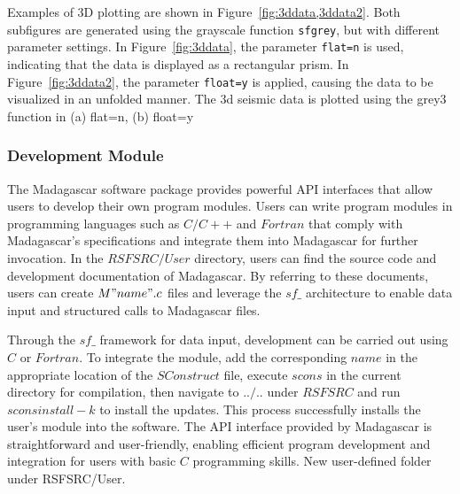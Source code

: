 Examples of 3D plotting are shown in Figure~\ref{fig:3ddata,3ddata2}. Both subfigures are generated using the grayscale function \texttt{sfgrey}, but with different parameter settings. In Figure~\ref{fig:3ddata}, the parameter \texttt{flat=n} is used, indicating that the data is displayed as a rectangular prism. In Figure~\ref{fig:3ddata2}, the parameter \texttt{float=y} is applied, causing the data to be visualized in an unfolded manner.
{The 3d seismic data is plotted using the grey3 function in (a) flat=n, (b) float=y}

\subsubsection{Development Module}

The Madagascar software package provides powerful API interfaces that allow users to develop their own program modules. Users can write program modules in programming languages such as $C/C++$ and $Fortran$ that comply with Madagascar's specifications and integrate them into Madagascar for further invocation. In the $RSFSRC/User$ directory, users can find the source code and development documentation of Madagascar. By referring to these documents, users can create $M"name".c$ files and leverage the $sf\_$ architecture to enable data input and structured calls to Madagascar files.

Through the $sf\_$ framework for data input, development can be carried out using $C$ or $Fortran$. To integrate the module, add the corresponding $name$ in the appropriate location of the $SConstruct$ file, execute $scons$ in the current directory for compilation, then navigate to $../..$ under $RSFSRC$ and run $scons install -k$ to install the updates. This process successfully installs the user's module into the software. The API interface provided by Madagascar is straightforward and user-friendly, enabling efficient program development and integration for users with basic $C$ programming skills.
{New user-defined folder under RSFSRC/User.}

